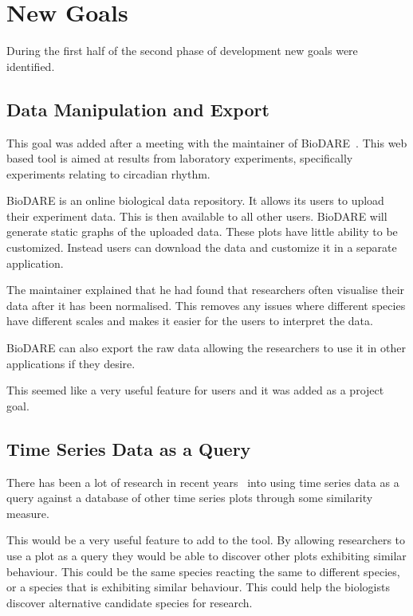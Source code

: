 \section{New Goals}
During the first half of the second phase of development new goals were identified.

\subsection{Data Manipulation and Export}

This goal was added after a meeting with the maintainer of BioDARE~\cite{biodare}.  This web based tool is aimed at results from laboratory experiments, specifically experiments relating to circadian rhythm.

BioDARE is an online biological data repository.  It allows its users to upload their experiment data.  This is then available to all other users.  BioDARE will generate static graphs of the uploaded data.  These plots have little ability to be customized.  Instead users can download the data and customize it in a separate application.

The maintainer explained that he had found that researchers often visualise their data after it has been normalised.  This removes any issues where different species have different scales and makes it easier for the users to interpret the data.

BioDARE can also export the raw data allowing the researchers to use it in other applications if they desire.

This seemed like a very useful feature for users and it was added as a project goal.

\subsection{Time Series Data as a Query}

There has been a lot of research in recent years~\cite{goldin, chakrabarti, popivanov, faloutsos2, bollobas} into using time series data as a query against a database of other time series plots through some similarity measure.

This would be a very useful feature to add to the tool.  By allowing researchers to use a plot as a query they would be able to discover other plots exhibiting similar behaviour.  This could be the same species reacting the same to different species, or a species that is exhibiting similar behaviour.  This could help the biologists discover alternative candidate species for research.

